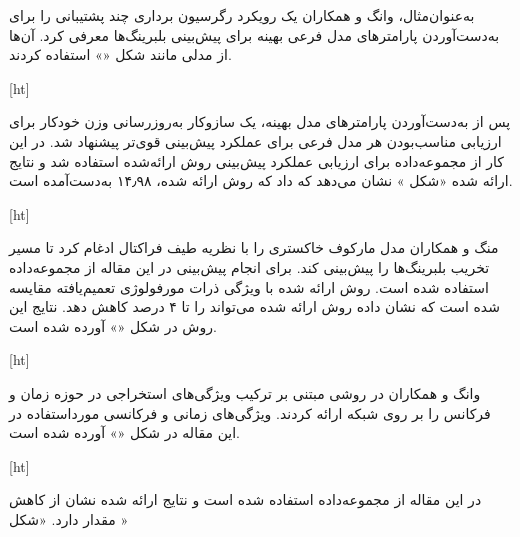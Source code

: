 به‌عنوان‌مثال، وانگ و همکاران  یک رویکرد رگرسیون برداری چند پشتیبانی را برای به‌دست‌آوردن پارامترهای مدل فرعی بهینه برای پیش‌بینی  بلبرینگ‌ها معرفی کرد. آن‌ها از مدلی مانند شکل «» استفاده کردند.

[ht]


پس از به‌دست‌آوردن پارامترهای مدل بهینه، یک سازوکار به‌روزرسانی وزن خودکار برای ارزیابی مناسب‌بودن هر مدل فرعی برای عملکرد پیش‌بینی قوی‌تر پیشنهاد شد. در این کار از مجموعه‌داده  برای ارزیابی عملکرد پیش‌بینی روش ارائه‌شده استفاده شد و نتایج ارائه شده «شکل » نشان می‌دهد که داد که  روش ارائه شده، ۱۴٫۹۸ به‌دست‌آمده است.
 
 
[ht]



منگ و همکاران  مدل مارکوف خاکستری را با نظریه طیف فراکتال ادغام کرد تا مسیر تخریب بلبرینگ‌ها را پیش‌بینی کند. برای انجام پیش‌بینی در این مقاله از مجموعه‌داده  استفاده شده است. روش ارائه شده با ویژگی ذرات مورفولوژی تعمیم‌یافته مقایسه شده است که نشان داده روش ارائه شده می‌تواند  را تا ۴ درصد کاهش دهد. نتایج این روش در شکل «» آورده شده است.



[ht]




وانگ و همکاران در  روشی مبتنی بر ترکیب ویژگی‌های استخراجی در حوزه زمان و فرکانس را بر روی شبکه  ارائه کردند. ویژگی‌های زمانی و فرکانسی مورداستفاده در این مقاله در شکل «» آورده شده است.


[ht]


در این مقاله از مجموعه‌داده  استفاده شده است و نتایج ارائه شده نشان از کاهش مقدار  دارد. «شکل »

